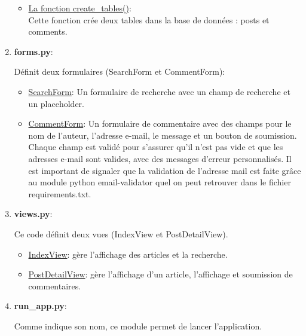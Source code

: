 \documentclass[a4paper,11pt]{article}
\begin{document}
\begin{enumerate}
\begin{itemize}
                            \item \underline{La fonction create\_tables()}:\\
                            \noindent Cette fonction crée deux tables dans la base de données : posts et comments.
                        \end{itemize}

                    \item \textbf{forms.py}:
                        
                        \noindent Définit deux formulaires (SearchForm et CommentForm):
                        \begin{itemize}
                            \item \underline{SearchForm}:  Un formulaire de recherche avec un champ de recherche et un placeholder.
                            \item \underline{CommentForm}: Un formulaire de commentaire avec des champs pour le nom de l'auteur, l'adresse e-mail, 
                            le message et un bouton de soumission. Chaque champ est validé pour s'assurer qu'il n'est pas vide et que les adresses e-mail sont valides, avec des messages d'erreur personnalisés.
                            \noindent Il est important de signaler que la validation de l'adresse mail est faite grâce au module python email-validator quel on peut retrouver dans le fichier requirements.txt.
                        \end{itemize}
                    \item \textbf{views.py}:
                        

                        \noindent Ce code définit deux vues (IndexView et PostDetailView).
                        \begin{itemize}
                            \item \underline{IndexView}:  gère l'affichage des articles et la recherche.
                            \item \underline{PostDetailView}: gère l'affichage d'un article, l'affichage et soumission de commentaires.
                        \end{itemize}

                    \item \textbf{run\_app.py}:
                        
                        \noindent Comme indique son nom, ce module permet de lancer l'application.
                \end{enumerate}
\end{document}
